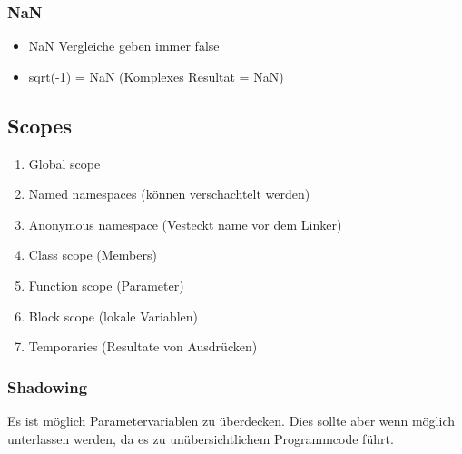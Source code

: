 \subsubsection{NaN} 
\begin{itemize}
	\item NaN Vergleiche geben immer false
	\item sqrt(-1) = NaN (Komplexes Resultat = NaN)
\end{itemize}

\subsection{Scopes}
\begin{enumerate}
	\item Global scope
	\item Named namespaces (können verschachtelt werden)
	\item Anonymous namespace (Vesteckt name vor dem Linker)
	\item Class scope (Members)
	\item Function scope (Parameter)
	\item Block scope (lokale Variablen)
	\item Temporaries (Resultate von Ausdrücken)
\end{enumerate}

\subsubsection{Shadowing}
Es ist möglich Parametervariablen zu überdecken. Dies sollte aber wenn möglich unterlassen werden, da es zu unübersichtlichem Programmcode führt.

